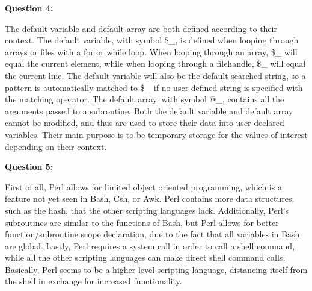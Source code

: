 \documentclass{article}
\begin{document}
\large{\textbf{Question 4:}}

The default variable and default array are both defined according to their context.
The default variable, with symbol \$\_, is defined when looping through arrays or files
with a for or while loop. When looping through an array, \$\_ will equal the current
element, while when looping through a filehandle, \$\_ will equal the current line. The
default variable will also be the default searched string, so a pattern is automatically
matched to \$\_ if no user-defined string is specified with the matching operator. The
default array, with symbol @\_, contains all the arguments passed to a subroutine. Both
the default variable and default array cannot be modified, and thus are used to store
their data into user-declared variables. Their main purpose is to be temporary storage
for the values of interest depending on their context.

\large{\textbf{Question 5:}}

First of all, Perl allows for limited object oriented programming, which is a feature
not yet seen in Bash, Csh, or Awk. Perl contains more data structures, such as the hash,
that the other scripting languages lack. Additionally, Perl's subroutines are similar to
the functions of Bash, but Perl allows for better function/subroutine scope declaration,
due to the fact that all variables in Bash are global. Lastly, Perl requires a system
call in order to call a shell command, while all the other scripting languages can make
direct shell command calls. Basically, Perl seems to be a higher level scripting language,
distancing itself from the shell in exchange for increased functionality.
\end{document}

